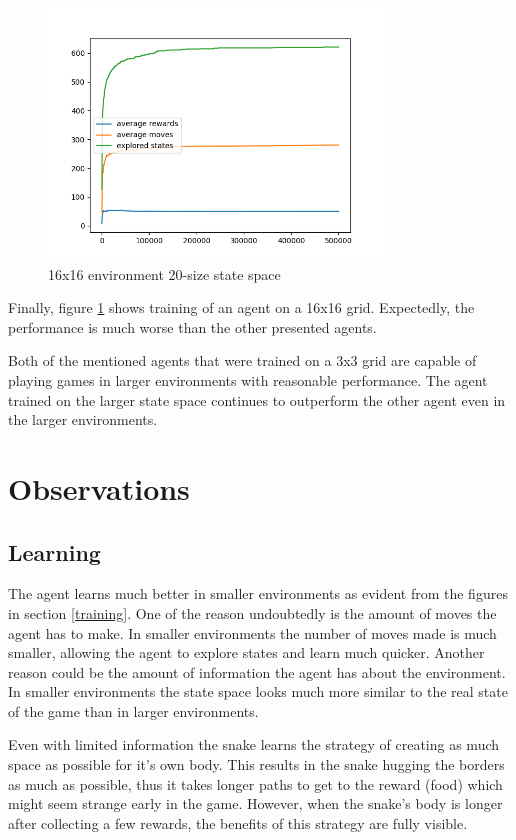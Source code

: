 \documentclass[lettersize,journal]{IEEEtran}
\begin{document}
\begin{figure}[!t]
\centering
\includegraphics[width=3.5in]{16_fig.png}
\caption{16x16 environment 20-size state space}
\label{fig3}
\end{figure}


Finally, figure \ref{fig3} shows training of an agent on a 16x16 grid.
Expectedly, the performance is much worse than the other presented agents.

Both of the mentioned agents that were trained on a 3x3 grid are capable of playing games in larger environments with
reasonable performance. The agent trained on the larger state space continues
to outperform the other agent even in the larger environments.


\section{Observations}

\subsection{Learning}
The agent learns much better in smaller environments as evident from
the figures in section \ref{training}. One of the reason
undoubtedly is the amount of moves the agent has to make. In
smaller environments the number of moves made is much smaller,
allowing the agent to explore states and learn much quicker.
Another reason could be the amount of information the agent has
about the environment. In smaller environments the state space
looks much more similar to the real state of the game than in
larger environments.

Even with limited information the snake learns the strategy
of creating as much space as possible for it's own body.
This results in the snake hugging the borders as much
as possible, thus it takes longer paths to get to the reward (food) which
might seem strange early in the game.
However, when the snake's body is longer after collecting a
few rewards, the benefits of this strategy are fully visible.
\end{document}
